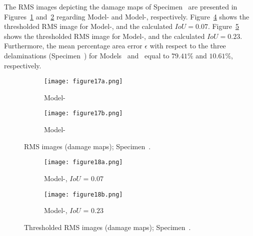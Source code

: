 The RMS images depicting the damage maps of Specimen~ are presented in 
Figures~\ref{fig:RMS_L3_S4_B_saeed} and~\ref{fig:RMS_L3_S4_B_ijjeh} regarding 
Model- and Model-, respectively.
Figure~\ref{fig:RMS_threshold_L3_S4_B_saeed} shows the thresholded RMS image for Model-, and the calculated \(IoU=0.07\).
Figure~\ref{fig:RMS_threshold_L3_S4_B_ijjeh} shows the thresholded RMS image for Model-, and the calculated \(IoU=0.23\).
Furthermore, the mean percentage area error \(\epsilon\) with respect to the three delaminations (Specimen~) for Models~ and~ equal to \(79.41\%\) and \(10.61\%\), respectively.
\begin{figure} [!h]
	\begin{subfigure}[b]{.49\textwidth}
		\centering
		\texttt{[image: figure17a.png]}
		\caption{\centering Model-}
		\label{fig:RMS_L3_S4_B_saeed}
	\end{subfigure}
	\hfill
	\begin{subfigure}[b]{.49\textwidth}
		\centering
		\texttt{[image: figure17b.png]}
		\caption{\centering Model-} 
		\label{fig:RMS_L3_S4_B_ijjeh}
	\end{subfigure}
	\caption{RMS images (damage maps); Specimen~.}
	\label{fig:RMS_L3_S4_B__images}
\end{figure} 
\begin{figure} [!h]
	\begin{subfigure}[b]{0.49\textwidth}
		\centering
		\texttt{[image: figure18a.png]}
		\caption{\centering Model-, \(IoU\) = \(0.07\)}
		\label{fig:RMS_threshold_L3_S4_B_saeed}
	\end{subfigure}
	\hfill
	\begin{subfigure}[b]{0.49\textwidth}
		\centering
		\texttt{[image: figure18b.png]}
		\caption{\centering Model-, \(IoU\) = \(0.23\)} 
		\label{fig:RMS_threshold_L3_S4_B_ijjeh}
	\end{subfigure}
	\caption{Thresholded RMS images (damage maps); Specimen~.}
	\label{fig:RMS_threshold_L3_S4_B__images}
\end{figure} 
